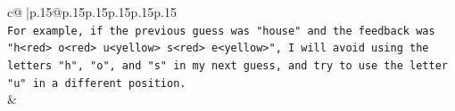\documentclass{article}
\begin{document}
{\begin{supertabular}{c@{$\;$}|p{.15\linewidth}@{}p{.15\linewidth}p{.15\linewidth}p{.15\linewidth}p{.15\linewidth}p{.15\linewidth}}
{{{\\ 
\texttt{For example, if the previous guess was "house" and the feedback was "h<red> o<red> u<yellow> s<red> e<yellow>", I will avoid using the letters "h", "o", and "s" in my next guess, and try to use the letter "u" in a different position.} \\
            }
        }
    }
    & \\ \\

\end{supertabular}
}
\end{document}
